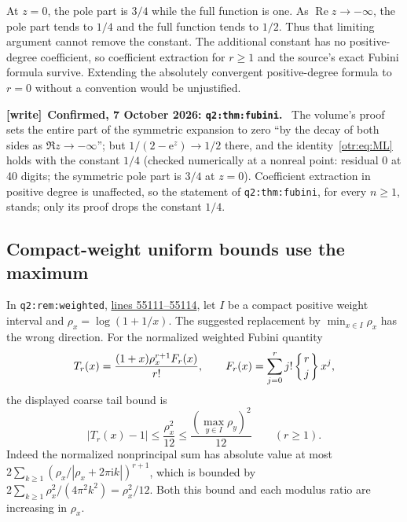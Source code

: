 \documentclass[11pt,a4paper]{article}
\theoremstyle{definition}\newtheorem{definition}[theorem]{Definition}
\theoremstyle{remark}\newtheorem{remark}[theorem]{Remark}
\newcommand{\e}{\mathrm e}
\newcommand{\ii}{\mathrm i}
\newcommand{\Rea}{\operatorname{Re}}
\newcommand{\file}[1]{\nolinkurl{#1}}
\newenvironment{writenote}[1][]{\par\smallskip\begingroup\small
 \noindent\textbf{[write]}\if\relax\detokenize{#1}\relax\else~\textbf{#1.}\fi\ }%
 {\par\endgroup\smallskip}
\begin{document}
At $z=0$, the pole part is $3/4$ while the full function is one. As $\Rea z\to-\infty$, the pole part tends to $1/4$ and the full function tends to $1/2$. Thus that limiting argument cannot remove the constant. The additional constant has no positive-degree coefficient, so coefficient extraction for $r\ge1$ and the source's exact Fubini formula survive. Extending the absolutely convergent positive-degree formula to $r=0$ without a convention would be unjustified.
\begin{writenote}[Confirmed, 7 October 2026: \file{q2:thm:fubini}]
The volume's proof sets the entire part of the symmetric expansion to zero
``by the decay of both sides as $\Re z\to-\infty$''; but $1/(2-\e^z)\to1/2$
there, and the identity~\eqref{otr:eq:ML} holds with the constant $1/4$
(checked numerically at a nonreal point: residual $0$ at 40 digits; the
symmetric pole part is $3/4$ at $z=0$). Coefficient extraction in positive
degree is unaffected, so the statement of \file{q2:thm:fubini}, for every
$n\ge1$, stands; only its proof drops the constant $1/4$.
\end{writenote}

\subsection{Compact-weight uniform bounds use the maximum}
In \texttt{q2:rem:weighted},
\href{https://github.com/VladimirReshetnikov/ProveIt/blob/c744ff67d111bf02d1daf2caaabeec7aaa4c7617/Analysis/Transseries/docs/series-and-transseries/Transseries_And_Inversion/transseries_and_inversion.tex#L55111-L55114}{lines 55111--55114}, let $I$ be a compact positive weight interval and $\rho_x=\log(1+1/x)$. The suggested replacement by $\min_{x\in I}\rho_x$ has the wrong direction. For the normalized weighted Fubini quantity
\[
 T_r(x)=\frac{(1+x)\rho_x^{r+1}F_r(x)}{r!},
 \qquad F_r(x)=\sum_{j=0}^r j!\left\{\genfrac{}{}{0pt}{}{r}{j}\right\}x^j,
\]
the displayed coarse tail bound is
\begin{equation}\label{otr:eq:weighted}
 |T_r(x)-1|\le\frac{\rho_x^2}{12}
 \le\frac{(\max_{y\in I}\rho_y)^2}{12}\qquad(r\ge1).
\end{equation}
Indeed the normalized nonprincipal sum has absolute value at most
$2\sum_{k\ge1}(\rho_x/|\rho_x+2\pi\ii k|)^{r+1}$, which is bounded by
$2\sum_{k\ge1}\rho_x^2/(4\pi^2k^2)=\rho_x^2/12$.
Both this bound and each modulus ratio are increasing in $\rho_x$.
\end{document}
